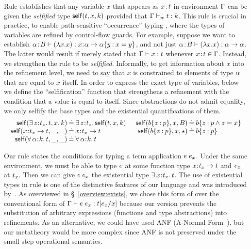 %
Rule \tVar establishes that any variable $x$ that
appears as $\bind{x}{\stype}$ in environment $\tcenv$
can be given the \emph{selfified} type \cite{Ou2004}
$\self{\stype}{x}{\skind}$ provided that
$\isWellFormed{\tcenv}{\stype}{\skind}$.
%
This rule is crucial in practice,
to enable path-sensitive ``occurrence'' typing \cite{Tob08},
where the types of variables are refined by control-flow guards.
%
For example, suppose we want to establish
$\hastype{\bind{\al}{\skbase}}{(\vabs{x}{x})}{\functype{x}{\al}{\breft{\al}{y}{x=y}}}$,
and not just $\hastype{\bind{\al}{\skbase}}{(\vabs{x}{x})}{\funcftype{\al}{\al}}$.
%
The latter would result
if \tVar merely stated that
$\hastype{\tcenv}{x}{\stype}$
whenever $\bind{x}{\stype} \in \tcenv$.
%
Instead, we strengthen the \tVar rule to
be \emph{selfified}.
%
Informally, to get information about $x$
into the refinement level, we need to say
that $x$ is constrained to elements of
type $\al$ that are equal to $x$ itself.
%
In order to express the exact type of
variables, below we define the ``selfification''
function that strengthens a refinement
with the condition that a value is equal
to itself.
%
Since abstractions do not admit equality,
we only selfify the base types and the existential
quantifications of them.
%
$$\begin{array}{r@{\hskip 0.03in}c@{\hskip 0.03in}l@{\hskip 0.2in}r@{\hskip 0.03in}c@{\hskip 0.03in}l}
  \self{\existype{z}{t_z}{t}}{x}{\skind} & \defeq & \existype{z}{t_z}{\self{t}{x}{\skind}} & 
  \self{\breft{\sbase}{z}{p}}{x}{\skbase} & \defeq & \breft{\sbase}{z}{p \wedge z = x} \\
  \self{\functype{x}{t_x}{t}}{\_}{\_} & \defeq & \functype{x}{t_x}{t} &
  \self{\breft{\sbase}{z}{p}}{x}{\skstar} & \defeq & \breft{\sbase}{z}{p} \\ 
  \self{\polytype{\al}{k}{t}}{\_}{\_} & \defeq & \polytype{\al}{k}{t}
\end{array}$$

%
Our rule \tApp states the conditions for typing
a term application $\app{\sexpr}{\sexpr_x}$.
%
Under the same environment,
we must be able to type $\sexpr$ at
some function type $\functype{x}{\stype_x}{\stype}$ and
$\sexpr_x$ at $\stype_x$. Then we can give $\app{\sexpr}{\sexpr_x}$
the existential type $\existype{x}{\stype_x}{\stype}$.
%
The use of existential types in rule \tApp
is one of the distinctive features of our language
and was introduced by~\citet{Knowles09}.
%
As overviewed in \S~\ref{overview:exists},
we chose this form of \tApp over the conventional
form of $\hastype{\tcenv}{\app{\sexpr}{\sexpr_x}}{\subst{\stype}{x}{\sexpr_x}}$
because our version prevents
the substitution of arbitrary expressions (\eg functions and type abstractions)
into refinements.
%
As an alternative, we could have used ANF (A-Normal Form~\cite{Flanagan93}),
but our metatheory would be more complex
since ANF is not preserved under the small step operational semantics.

